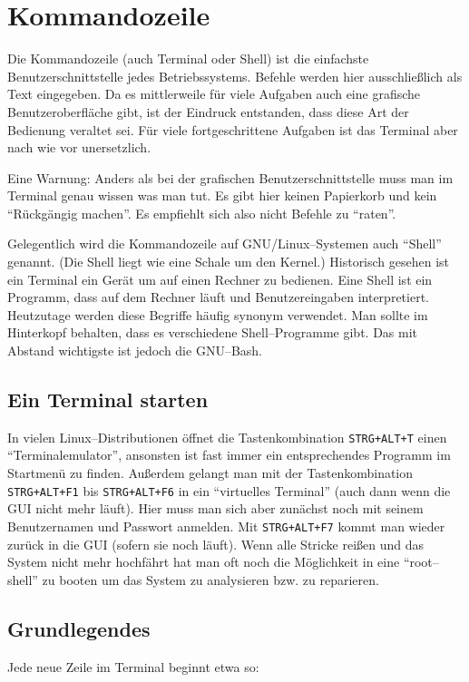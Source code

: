 \section{Kommandozeile}
Die Kommandozeile (auch Terminal oder Shell) ist die einfachste Benutzerschnittstelle jedes Betriebssystems. Befehle werden hier ausschließlich als Text eingegeben. Da es mittlerweile für viele Aufgaben auch eine grafische Benutzeroberfläche gibt, ist der Eindruck entstanden, dass diese Art der Bedienung veraltet sei. Für viele fortgeschrittene Aufgaben ist das Terminal aber nach wie vor unersetzlich. \par %
Eine Warnung: Anders als bei der grafischen Benutzerschnittstelle muss man im Terminal genau wissen was man tut. Es gibt hier keinen Papierkorb und kein ``Rückgängig machen''. Es empfiehlt sich also nicht Befehle zu ``raten''. \par
Gelegentlich wird die Kommandozeile auf GNU/Linux--Systemen auch ``Shell'' genannt. (Die Shell liegt wie eine Schale um den Kernel.) Historisch gesehen ist ein Terminal ein Gerät um auf einen Rechner zu bedienen. Eine Shell ist ein Programm, dass auf dem Rechner läuft und Benutzereingaben interpretiert. Heutzutage werden diese Begriffe häufig synonym verwendet. Man sollte im Hinterkopf behalten, dass es verschiedene Shell--Programme gibt. Das mit Abstand wichtigste ist jedoch die GNU--Bash.

\subsection{Ein Terminal starten}
In vielen Linux--Distributionen öffnet die Tastenkombination \lstinline$STRG+ALT+T$ einen ``Terminalemulator'', ansonsten ist fast immer ein entsprechendes Programm im Startmenü zu finden. Außerdem gelangt man mit der Tastenkombination \lstinline$STRG+ALT+F1$ bis \lstinline$STRG+ALT+F6$ in ein ``virtuelles Terminal'' (auch dann wenn die GUI nicht mehr läuft). Hier muss man sich aber zunächst noch mit seinem Benutzernamen und Passwort anmelden. Mit \lstinline$STRG+ALT+F7$ kommt man wieder zurück in die GUI (sofern sie noch läuft). Wenn alle Stricke reißen und das System nicht mehr hochfährt hat man oft noch die Möglichkeit in eine ``root--shell'' zu booten um das System zu analysieren bzw. zu reparieren.

\subsection{Grundlegendes}
Jede neue Zeile im Terminal beginnt etwa so:

